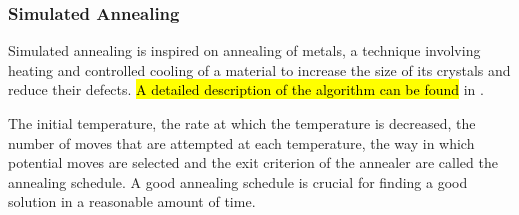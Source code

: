 \documentclass[a4paper,oneside,12pt]{article}
\begin{document}

\subsubsection{Simulated Annealing}
Simulated annealing \cite{kirkpatrick1983obsa} is inspired on annealing of metals, a technique involving heating and controlled cooling of a material to increase the size of its crystals and reduce their defects.
\hl{A detailed description of the algorithm can be found} in \cite{kravitz1987placement}.

The initial temperature, the rate at which the temperature is decreased, the number of moves that are attempted at each temperature, the way in which potential moves are selected and the exit criterion of the annealer are called the annealing schedule. A good annealing schedule is crucial for finding a good solution in a reasonable amount of time.
\end{document}
